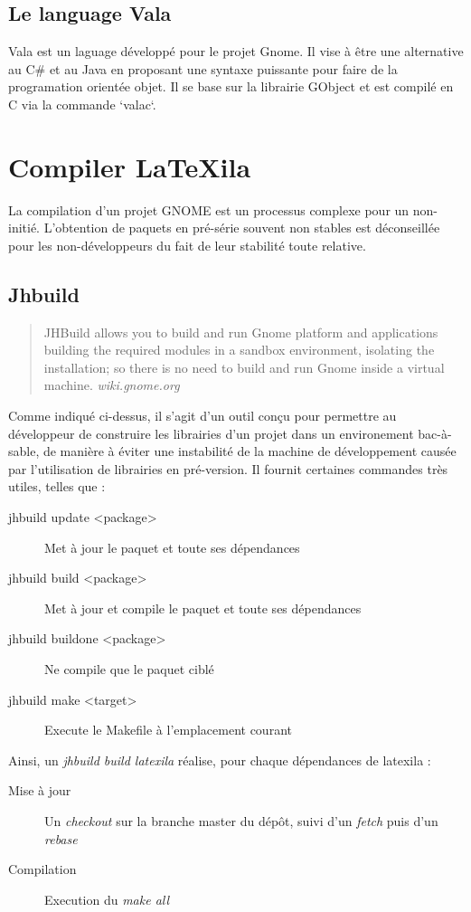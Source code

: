 \documentclass[a4paper,11pt]{report}
\begin{document}
\subsection{Le language Vala}
\label{sss:vala}
Vala est un laguage développé pour le projet Gnome. Il vise à être une alternative au C\# et au Java en proposant une syntaxe puissante pour faire de la programation orientée objet. Il se base sur la librairie GObject et est compilé en C via la commande `valac`.

\section{Compiler LaTeXila}
\label{cha:compiler}
La compilation d'un projet GNOME est un processus complexe pour un non-initié. L'obtention de paquets en pré-série souvent non stables est déconseillée pour les non-développeurs du fait de leur stabilité toute relative.

\subsection{Jhbuild}
\label{sub:jhbuild}
\begin{quote}
  JHBuild allows you to build and run Gnome platform and applications building the required modules in a sandbox environment, isolating the installation; so there is no need to build and run Gnome inside a virtual machine. \textit{wiki.gnome.org}
\end{quote}
Comme indiqué ci-dessus, il s'agit d'un outil conçu pour permettre au développeur de construire les librairies d'un projet dans un environement bac-à-sable, de manière à éviter une instabilité de la machine de développement causée par l'utilisation de librairies en pré-version. Il fournit certaines commandes très utiles, telles que :
\begin{description}
  \item[jhbuild update <package>] Met à jour le paquet et toute ses dépendances
  \item[jhbuild build <package>] Met à jour et compile le paquet et toute ses dépendances
  \item[jhbuild buildone <package>] Ne compile que le paquet ciblé
  \item[jhbuild make <target>] Execute le Makefile à l'emplacement courant
\end{description}

Ainsi, un \textit{jhbuild build latexila} réalise, pour chaque dépendances de latexila :
\begin{description} 
  \item[Mise à jour] Un \textit{checkout} sur la branche master du dépôt, suivi d'un \textit{fetch} puis d'un \textit{rebase} 
  \item[Compilation] Execution du \textit{make all}
\end{description}
\end{document}
